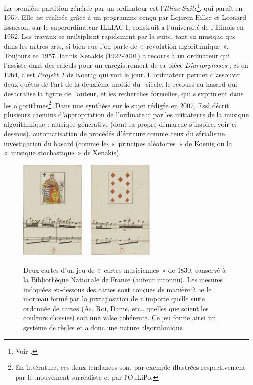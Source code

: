 \documentclass[a4paper,12pt]{article}
\newcommand{\guill}[1]{«~#1~»}
\begin{document}
La première partition générée par un ordinateur est l'\emph{Illiac Suite}\footnote{Voir \cite{hiller1979experimental}.}, qui paraît en 1957. Elle est réalisée grâce à un programme conçu par Lejaren Hiller et Leonard Issacson, sur le superordinateur ILLIAC I, construit à l'université de l'Illinois en 1952. Les travaux se multiplient rapidement par la suite, tant en musique que dans les autres arts, si bien que l'on parle de \guill{révolution algorithmique}. Toujours en 1957, Iannis Xenakis (1922-2001) a recours à un ordinateur qui l'assiste dans des calculs pour un enregistrement de sa pièce \emph{Diamorphoses} ; et en 1964, c'est \emph{Projekt 1} de Koenig qui voit le jour. L'ordinateur permet d'assouvir deux quêtes de l'art de la deuxième moitié du \XXe~siècle, le recours au hasard qui désacralise la figure de l'auteur, et les recherches formelles, qui s'expriment dans les algorithmes\footnote{En littérature, ces deux tendances sont par exemple illustrées respectivement par le mouvement surréaliste et par l'OuLiPo.}. Dans une synthèse sur le sujet rédigée en 2007\cite{essl2007algorithmic}, Essl décrit plusieurs chemins d'appropriation de l'ordinateur par les initiateurs de la musique algorithmique : musique générative (dont sa propre démarche s'inspire, voir ci-dessous), automatisation de procédés d'écriture comme ceux du sérialisme, investigation du hasard (comme les \guill{principes aléatoires} de Koenig ou la \guill{musique stochastique} de Xenakis).

\begin{figure}[h!]
\begin{center}
\includegraphics[height=5cm]{images/carte1.jpg}~~
\includegraphics[height=5cm]{images/carte2.jpg}
\label{cartesajouer}
\caption{\footnotesize Deux cartes d'un jeu de \guill{cartes musiciennes} de 1830, conservé à la Bibliothèque Nationale de France (auteur inconnu). Les mesures indiquées en-dessous des cartes sont conçues de manière à ce le morceau formé par la juxtaposition de n'importe quelle suite ordonnée de cartes (As, Roi, Dame, etc., quelles que soient les couleurs choisies) soit une valse cohérente. Ce jeu forme ainsi un système de règles et a donc une nature algorithmique.}
\end{center}
\end{figure}
\end{document}
